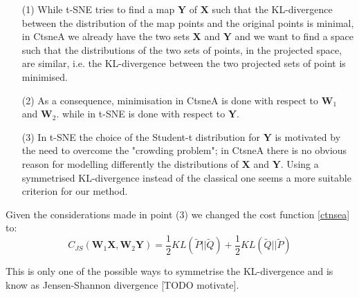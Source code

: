 \documentclass[11pt]{article}
\begin{document}
\begin{itemize}
\item[(1)] While t-SNE tries to find a map $\mathbf{Y}$ of $\mathbf{X}$ such that the KL-divergence between the distribution of the map points and the original points is minimal, in CtsneA we already have the two sets $\mathbf{X}$ and $\mathbf{Y}$ and we want to find a space such that the distributions of the two sets of points, in the projected space, are similar, i.e. the KL-divergence between the two projected sets of point is minimised.
\item[(2)] As a consequence, minimisation in CtsneA is done with respect to $\mathbf{W}_1$ and $\mathbf{W}_2$. while in t-SNE is done with respect to $\mathbf{Y}$.
\item[(3)] In t-SNE the choice of the Student-t distribution for $\mathbf{Y}$ is motivated by the need to overcome the "crowding problem"; in CtsneA there is no obvious reason for modelling differently the distributions of $\mathbf{X}$ and $\mathbf{Y}$. Using a symmetrised KL-divergence instead of the classical one seems a more suitable criterion for our method. 
\end{itemize} 

Given the considerations made in point (3) we changed the cost function \ref{ctnsea} to:
\begin{equation}\label{ctsnea2}
C_{JS}(\mathbf{W}_1 \mathbf{X},{\mathbf{W}_2 \mathbf{Y}})={\displaystyle \frac{1}{2}KL(\tilde{P}||\tilde{Q})+\frac{1}{2}KL(\tilde{Q}||\tilde{P})}\end{equation}

This is only one of the possible ways to symmetrise the KL-divergence and is know as Jensen-Shannon divergence [TODO motivate].
\end{document}
